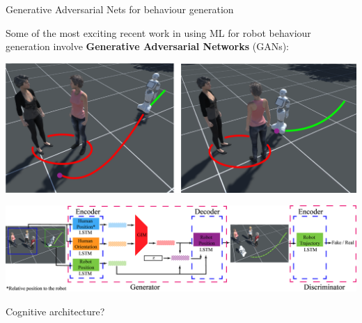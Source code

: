 \documentclass[xcolor=table]{beamer}
\begin{document}
{

\begin{frame}{Generative Adversarial Nets for behaviour generation}

    Some of the most exciting recent work in using ML for robot behaviour
    generation involve \textbf{Generative Adversarial Networks} (GANs):

            \begin{center}
                \includegraphics[width=0.6\linewidth]{figs/generation/fangkai-yang-appgan-traj.png}

                \includegraphics[width=0.8\linewidth]{figs/generation/fangkai-yang-appgan.png}
            \end{center}
\end{frame}
}

\begin{frame}[plain]

    \begin{center}
        \Large
 Cognitive architecture?
    \end{center}

\end{frame}







\end{document}

